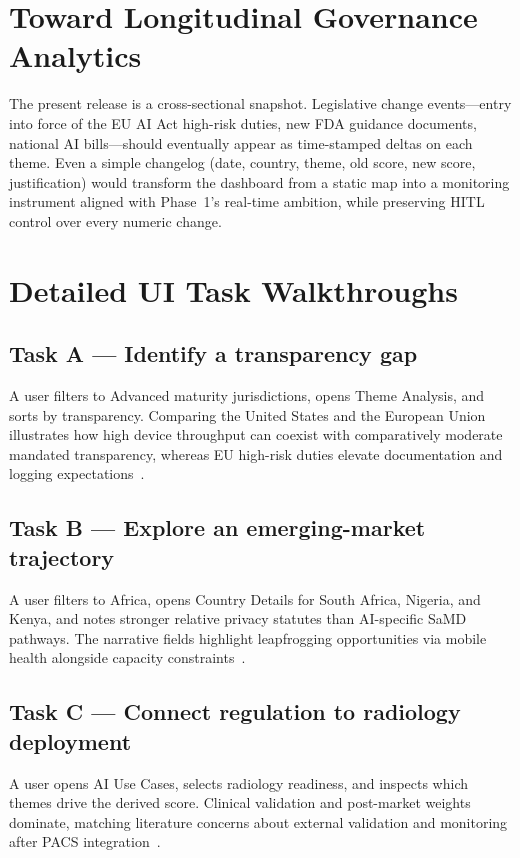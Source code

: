 \section{Toward Longitudinal Governance Analytics}
\label{sec:longitudinal}

The present release is a cross-sectional snapshot. Legislative change events---entry into force of the EU AI Act high-risk duties, new FDA guidance documents, national AI bills---should eventually appear as time-stamped deltas on each theme. Even a simple changelog (date, country, theme, old score, new score, justification) would transform the dashboard from a static map into a monitoring instrument aligned with Phase~1's real-time ambition, while preserving HITL control over every numeric change.

\section{Detailed UI Task Walkthroughs}
\label{sec:walkthroughs}

\subsection{Task A --- Identify a transparency gap}
A user filters to Advanced maturity jurisdictions, opens Theme Analysis, and sorts by transparency. Comparing the United States and the European Union illustrates how high device throughput can coexist with comparatively moderate mandated transparency, whereas EU high-risk duties elevate documentation and logging expectations~\cite{euaiact2024,fda2021}.

\subsection{Task B --- Explore an emerging-market trajectory}
A user filters to Africa, opens Country Details for South Africa, Nigeria, and Kenya, and notes stronger relative privacy statutes than AI-specific SaMD pathways. The narrative fields highlight leapfrogging opportunities via mobile health alongside capacity constraints~\cite{who2021}.

\subsection{Task C --- Connect regulation to radiology deployment}
A user opens AI Use Cases, selects radiology readiness, and inspects which themes drive the derived score. Clinical validation and post-market weights dominate, matching literature concerns about external validation and monitoring after PACS integration~\cite{wu2021,hwang2019}.


